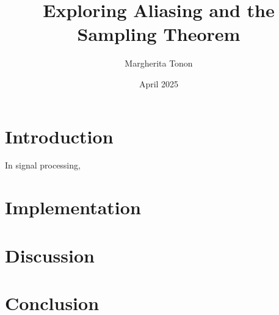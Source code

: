 \documentclass{article}
\title{Exploring Aliasing and the Sampling Theorem} %
\author{Margherita Tonon}
\date{April 2025}
\begin{document}
\maketitle

\section{Introduction}
In signal processing, 

\section{Implementation}


\section{Discussion}

\section{Conclusion}
\end{document}
